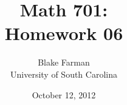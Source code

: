 \documentclass[10pt]{amsart}
\author{Blake Farman\\University of South Carolina}
\title{Math 701:\\Homework 06}
\date{October 12, 2012}
\begin{document}
\maketitle

\newcommand{\Inn}[1]{\operatorname{Inn}\left(#1\right)}
\newcommand{\Aut}[1]{\operatorname{Aut}\left(#1\right)}
\newcommand{\cntr}[1]{\mathbf{Z}\left(#1\right)}
\newcommand{\abs}[1]{\left| #1 \right|}
\newcommand{\SL}[2]{\operatorname{SL}_#1\left(#2\right)}
\newcommand{\Mat}[2]{\operatorname{Mat}_{#1}\left(#2\right)}
\newcommand{\orbit}[1]{\mathcal{O}_{#1}}
\newcommand{\real}[1]{\operatorname{\mathfrak{Re}}\left(#1\right)}
\newcommand{\imag}[1]{\operatorname{\mathfrak{Im}}\left(#1\right)}
\newcommand{\uhp}{\mathfrak{h}}
\newcommand{\Syl}[2]{\operatorname{Syl}_{#1}\left(#2\right)}

\renewcommand{\qedsymbol}{\ensuremath{\blacksquare}}

\newtheorem*{ex2}{2}
\newtheorem*{ex3}{3}
\newtheorem*{ex4}{4}
\newtheorem*{ex5}{5}
\newtheorem*{ex6}{6}
\newtheorem*{ex7}{7}
\newtheorem*{lem}{Lemma}
\end{document}
